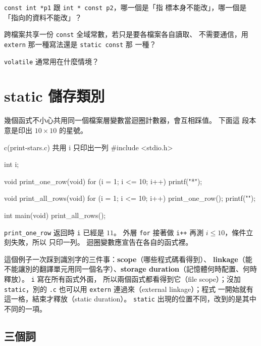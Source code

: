 \begin{drills}[label=drills:decl-const]
\item \texttt{const int *p1} 跟 \texttt{int * const p2}，哪一個是「指
標本身不能改」，哪一個是「指向的資料不能改」？
\item 跨檔案共享一份 \texttt{const} 全域常數，若只是要各檔案各自讀取、
不需要通信，用 \texttt{extern} 那一種寫法還是 \texttt{static const} 那
一種？
\item \texttt{volatile} 通常用在什麼情境？
\end{drills}

\section{static 儲存類別}
\label{sec:decl-static}

幾個函式不小心共用同一個檔案層變數當迴圈計數器，會互相踩值。 下面這
段本意是印出 $10 \times 10$ 的星號。

\begin{example}{c}{(print-stars.c) 共用 i 只印出一列}
#include <stdio.h>

int i;

void print_one_row(void) {
    for (i = 1; i <= 10; i++) {
        printf("*");
    }
}

void print_all_rows(void) {
    for (i = 1; i <= 10; i++) {
        print_one_row();
        printf("\n");
    }
}

int main(void) {
    print_all_rows();
}
\end{example}

\iosample{
}{
********** \\
}

\texttt{print\_one\_row} 返回時 \texttt{i} 已經是 $11$。 外層
\texttt{for} 接著做 \texttt{i++} 再測 $i \le 10$，條件立刻失敗，所以
只印一列。 迴圈變數應宣告在各自的函式裡。

這個例子一次踩到識別字的三件事：\textbf{scope}（哪些程式碼看得到）、
\textbf{linkage}（能不能讓別的翻譯單元用同一個名字）、\textbf{storage
duration}（記憶體何時配置、何時釋放）。 \texttt{i} 寫在所有函式外面，
所以兩個函式都看得到它（file scope）；沒加 \texttt{static}，別的
\texttt{.c} 也可以用 \texttt{extern} 連過來（external linkage）；程式
一開始就有這一格，結束才釋放（static duration）。
\texttt{static} 出現的位置不同，改到的是其中不同的一項。

\subsection{三個詞}

